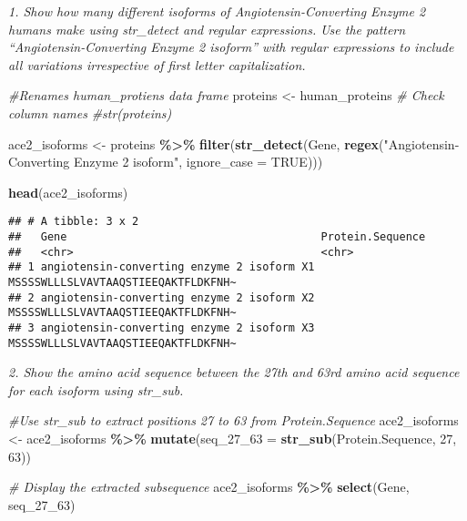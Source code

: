 \documentclass[
]{article}
\newenvironment{Shaded}{\begin{snugshade}}{\end{snugshade}}
\newcommand{\AttributeTok}[1]{\textcolor[rgb]{0.13,0.29,0.53}{#1}}
\newcommand{\CommentTok}[1]{\textcolor[rgb]{0.56,0.35,0.01}{\textit{#1}}}
\newcommand{\ConstantTok}[1]{\textcolor[rgb]{0.56,0.35,0.01}{#1}}
\newcommand{\DecValTok}[1]{\textcolor[rgb]{0.00,0.00,0.81}{#1}}
\newcommand{\FunctionTok}[1]{\textcolor[rgb]{0.13,0.29,0.53}{\textbf{#1}}}
\newcommand{\NormalTok}[1]{#1}
\newcommand{\OtherTok}[1]{\textcolor[rgb]{0.56,0.35,0.01}{#1}}
\newcommand{\SpecialCharTok}[1]{\textcolor[rgb]{0.81,0.36,0.00}{\textbf{#1}}}
\newcommand{\StringTok}[1]{\textcolor[rgb]{0.31,0.60,0.02}{#1}}
\begin{document}
\emph{1. Show how many different isoforms of Angiotensin-Converting
Enzyme 2 humans make using str\_detect and regular expressions.}
\emph{Use the pattern ``Angiotensin-Converting Enzyme 2 isoform'' with
regular expressions to include all variations irrespective of first
letter capitalization.}

\begin{Shaded}
\begin{Highlighting}[]
\CommentTok{\#Renames human\_protiens data frame}
\NormalTok{proteins }\OtherTok{\textless{}{-}}\NormalTok{ human\_proteins}
\CommentTok{\# Check column names}
\CommentTok{\#str(proteins)}

\NormalTok{ace2\_isoforms }\OtherTok{\textless{}{-}}\NormalTok{ proteins }\SpecialCharTok{\%\textgreater{}\%}
  \FunctionTok{filter}\NormalTok{(}\FunctionTok{str\_detect}\NormalTok{(Gene, }\FunctionTok{regex}\NormalTok{(}\StringTok{"Angiotensin{-}Converting Enzyme 2 isoform"}\NormalTok{, }\AttributeTok{ignore\_case =} \ConstantTok{TRUE}\NormalTok{)))}

\FunctionTok{head}\NormalTok{(ace2\_isoforms)}
\end{Highlighting}
\end{Shaded}

\begin{verbatim}
## # A tibble: 3 x 2
##   Gene                                       Protein.Sequence                   
##   <chr>                                      <chr>                              
## 1 angiotensin-converting enzyme 2 isoform X1 MSSSSWLLLSLVAVTAAQSTIEEQAKTFLDKFNH~
## 2 angiotensin-converting enzyme 2 isoform X2 MSSSSWLLLSLVAVTAAQSTIEEQAKTFLDKFNH~
## 3 angiotensin-converting enzyme 2 isoform X3 MSSSSWLLLSLVAVTAAQSTIEEQAKTFLDKFNH~
\end{verbatim}

\emph{2. Show the amino acid sequence between the 27th and 63rd amino
acid sequence for each isoform using str\_sub.}

\begin{Shaded}
\begin{Highlighting}[]
\CommentTok{\#Use str\_sub to extract positions 27 to 63 from Protein.Sequence}
\NormalTok{ace2\_isoforms }\OtherTok{\textless{}{-}}\NormalTok{ ace2\_isoforms }\SpecialCharTok{\%\textgreater{}\%}
  \FunctionTok{mutate}\NormalTok{(}\AttributeTok{seq\_27\_63 =} \FunctionTok{str\_sub}\NormalTok{(Protein.Sequence, }\DecValTok{27}\NormalTok{, }\DecValTok{63}\NormalTok{))}

\CommentTok{\# Display the extracted subsequence}
\NormalTok{ace2\_isoforms }\SpecialCharTok{\%\textgreater{}\%} \FunctionTok{select}\NormalTok{(Gene, seq\_27\_63)}
\end{Highlighting}
\end{Shaded}
\end{document}

